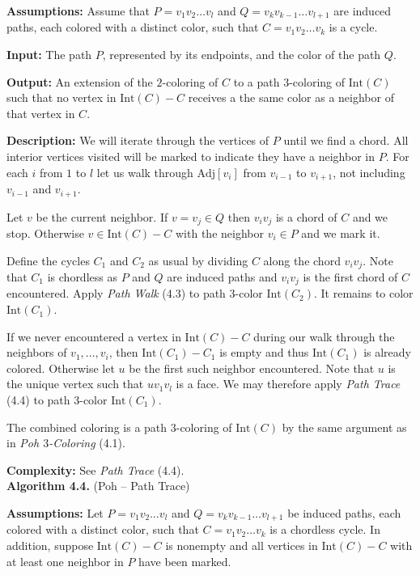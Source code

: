 \documentclass[letterpaper, 12pt]{article}
\theoremstyle{thm}
\begin{document}
\noindent\textbf{Assumptions:} Assume that $P=v_1v_2\ldots v_l$ and
$Q=v_kv_{k-1}\ldots v_{l+1}$ are induced paths, each colored with a distinct
color, such that $C=v_1v_2\ldots v_k$ is a cycle.

\noindent\textbf{Input:} The path $P$, represented by its endpoints, and the
color of the path $Q$.

\noindent\textbf{Output:} An extension of the $2$-coloring of $C$ to
a path $3$-coloring of $\text{Int}(C)$ such that
no vertex in $\text{Int}(C)-C$ receives a the same color as a neighbor of that
vertex in $C$.

\noindent\textbf{Description:} 
We will iterate through the vertices of $P$ until we find a chord. All interior
vertices visited will be marked to indicate they have a neighbor in $P$. For
each $i$ from $1$ to $l$ let us walk through
$\text{Adj}[v_i]$ from $v_{i-1}$ to $v_{i+1}$, not including
$v_{i-1}$ and $v_{i+1}$.

Let $v$ be the current neighbor. If $v=v_j\in Q$ then $v_iv_j$ is a chord of $C$
and we stop. Otherwise $v\in \text{Int}(C)-C$ with the neighbor $v_i\in P$ and we
mark it.

Define the cycles $C_1$ and $C_2$ as usual by dividing $C$ along the chord
$v_iv_j$. Note that $C_1$ is chordless as $P$ and $Q$ are induced paths
and $v_iv_j$ is the first chord of $C$ encountered. Apply \textit{Path Walk}
(4.3) to path $3$-color $\text{Int}(C_2)$. It remains to color
$\text{Int}(C_1)$.

If we never encountered a vertex in $\text{Int}(C)-C$ during our walk through
the neighbors of $v_1,\ldots,v_i$, then $\text{Int}(C_1)-C_1$ is empty and thus
$\text{Int}(C_1)$ is already colored. Otherwise let $u$ be the first such
neighbor encountered. Note that $u$ is the unique vertex
such that $uv_1v_l$ is a face. We may therefore apply \textit{Path Trace} (4.4)
to path $3$-color $\text{Int}(C_1)$.

The combined coloring is a path $3$-coloring of $\text{Int}(C)$ by the
same argument as in \textit{Poh $3$-Coloring} (4.1).

\noindent\textbf{Complexity:} See \textit{Path Trace} (4.4).\\

\noindent\textbf{Algorithm 4.4.} (Poh -- Path Trace)

\noindent\textbf{Assumptions:} Let $P=v_1v_2\ldots v_l$ and
$Q=v_kv_{k-1}\ldots v_{l+1}$ be induced paths, each colored with a distinct
color, such that $C=v_1v_2\ldots v_k$ is a chordless cycle. In
addition, suppose $\text{Int}(C)-C$ is nonempty and all vertices in
$\text{Int}(C)- C$ with at least one neighbor in $P$ have been marked.
\end{document}
